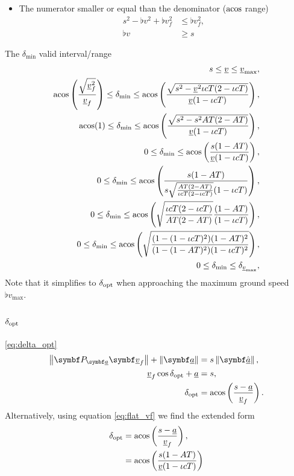 \begin{itemize}
\item
The numerator smaller or equal than the denominator ($\operatorname{acos}$ range)
\begin{align*}
s^2 - \flat{v}^2 + \flat{v}_f^2 &\le \flat{v}_f^2,\\
\flat{v} &\ge s
\end{align*}
\end{itemize}


The $\delta_{\min}$ valid interval/range
\begin{align*}
s \le \flat{v} \le \flat{v}_{\max},\\
\acos\left(\frac{\sqrt{\flat{v}_f^2}}{\flat{v}_f} \right) \le \delta_{\min} \le \acos\left(\frac{\sqrt{s^2 - \flat{v}^2\iota cT(2 - \iota cT)}}{\flat{v}(1 - \iota cT)}\right),\\
\acos(1) \le \delta_{\min} \le \acos\left(\frac{\sqrt{s^2 - s^2 AT(2 - AT)}}{\flat{v}(1 - \iota cT)}\right),\\
0 \le \delta_{\min} \le \acos\left(\frac{s(1 - AT)}{\flat{v}(1 - \iota cT)}\right),\\
0 \le \delta_{\min} \le \acos\left(\frac{s(1 - AT)}{s\sqrt{\frac{AT(2 - AT)}{\iota cT(2 - \iota cT)}} (1 - \iota cT)}\right),\\
0 \le \delta_{\min} \le \acos\left(\sqrt{\frac{\iota cT(2 - \iota cT)}{AT(2 - AT)}} \frac{(1 - AT)}{(1 - \iota cT)}\right),\\
0 \le \delta_{\min} \le \acos\left(\sqrt{\frac{(1 - (1 - \iota cT)^2) (1 - AT)^2}{(1 - (1 - AT)^2) (1 - \iota cT)^2}}\right),\\
0 \le \delta_{\min} \le \delta_{\flat{v}_{\max}},\\
\end{align*}
Note that it simplifies to $\delta_{\operatorname{opt}}$ when approaching the maximum ground speed $\flat{v}_{\max}$.


\subsection{\texorpdfstring{$\delta_{\operatorname{opt}}$}{delta\_opt}}
\eqref{eq:delta_opt}
\begin{align*}
\norm{\projmat{\flat{a}} \vec{\flat{v}}_f} + \norm{\vec{\flat{a}}} &= s \norm{\uvec{\flat{a}}},\\
\flat{v}_f \cos\delta_{\opt} + \flat{a} &= s,\\
\delta_{\opt} &= \acos\left( \frac{s - \flat{a}}{\flat{v}_f} \right).
\end{align*}
Alternatively, using equation \eqref{eq:flat_vf} we find the extended form
\begin{align*}
\delta_{\opt} &= \acos\left( \frac{s - \flat{a}}{\flat{v}_f} \right),\\
&= \acos\left( \frac{s(1 - AT)}{\flat{v}(1 - \iota cT)} \right)
\end{align*}

